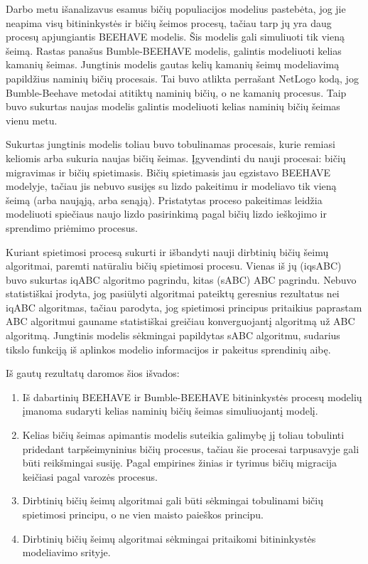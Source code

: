 \documentclass{VUMIFKompMagistrinis}
\begin{document}

Darbo metu išanalizavus  esamus bičių populiacijos modelius pastebėta, jog jie neapima visų bitininkystės ir bičių šeimos procesų, tačiau tarp jų yra daug procesų apjungiantis BEEHAVE modelis. Šis modelis gali simuliuoti tik vieną šeimą. Rastas panašus Bumble-BEEHAVE modelis, galintis modeliuoti kelias kamanių šeimas. Jungtinis modelis gautas kelių kamanių šeimų modeliavimą papildžius naminių bičių procesais. Tai buvo atlikta perrašant NetLogo kodą, jog Bumble-Beehave metodai atitiktų naminių bičių, o ne kamanių procesus. Taip buvo sukurtas naujas modelis galintis modeliuoti kelias naminių bičių šeimas vienu metu.

Sukurtas jungtinis modelis toliau buvo tobulinamas procesais, kurie remiasi keliomis arba sukuria naujas bičių šeimas. Įgyvendinti du nauji procesai: bičių migravimas ir bičių spietimasis. Bičių spietimasis jau egzistavo BEEHAVE modelyje, tačiau jis nebuvo susijęs su lizdo pakeitimu ir modeliavo tik vieną šeimą (arba naująją, arba senąją). Pristatytas proceso pakeitimas leidžia modeliuoti spiečiaus naujo lizdo pasirinkimą pagal bičių lizdo ieškojimo ir sprendimo priėmimo procesus.

Kuriant spietimosi procesą sukurti ir išbandyti nauji dirbtinių bičių šeimų algoritmai, paremti natūraliu bičių spietimosi procesu. Vienas iš jų (iqsABC) buvo sukurtas iqABC algoritmo pagrindu, kitas (sABC) ABC pagrindu. Nebuvo statistiškai įrodyta, jog pasiūlyti algoritmai pateiktų geresnius rezultatus nei iqABC algoritmas, tačiau parodyta, jog spietimosi principus pritaikius paprastam ABC algoritmui gauname statistiškai greičiau konverguojantį algoritmą už ABC algoritmą. Jungtinis modelis sėkmingai papildytas sABC algoritmu, sudarius tikslo funkciją iš aplinkos modelio informacijos ir pakeitus sprendinių aibę.

Iš gautų rezultatų daromos šios išvados:
\begin{enumerate}
    \item Iš dabartinių BEEHAVE ir Bumble-BEEHAVE bitininkystės procesų modelių įmanoma sudaryti kelias naminių bičių šeimas simuliuojantį modelį.
    \item Kelias bičių šeimas apimantis modelis suteikia galimybę jį toliau tobulinti pridedant tarpšeimyninius bičių procesus, tačiau šie procesai tarpusavyje gali būti reikšmingai susiję. Pagal empirines žinias ir tyrimus bičių migracija keičiasi pagal varozės procesus.
    \item Dirbtinių bičių šeimų algoritmai gali būti sėkmingai tobulinami bičių spietimosi principu, o ne vien maisto paieškos principu.
    \item Dirbtinių bičių šeimų algoritmai sėkmingai pritaikomi bitininkystės modeliavimo srityje.
\end{enumerate}
\end{document}
